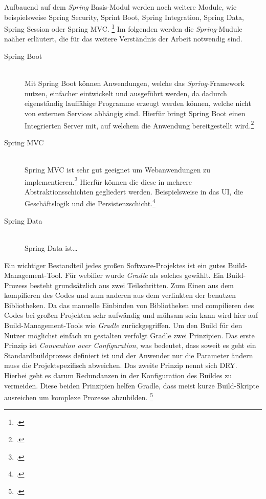 Aufbauend auf dem \textit{Spring} Basis-Modul werden noch weitere Module, wie beispielsweise Spring Security, Sprint Boot, Spring Integration, Spring Data, Spring Session oder Spring MVC. \footcite[Vgl.][2]{springPivotal} Im folgenden werden die \textit{Spring}-Mudule naäher erläutert, die für das weitere Verständnis der Arbeit notwendig sind.

\begin{description}
  \item[Spring Boot] \hfill \\
    Mit Spring Boot können Anwendungen, welche das \textit{Spring}-Framework nutzen, einfacher eintwickelt und ausgeführt werden, da dadurch eigenständig lauffähige Programme erzeugt werden können, welche nicht von externen Services abhängig sind. Hierfür bringt Spring Boot einen Integrierten Server mit, auf welchem die Anwendung bereitgestellt wird.\footcite[Vgl.][1]{springBoot}
  \item[Spring MVC] \hfill \\
    Spring MVC ist sehr gut geeignet um Webanwendungen zu implementieren.\footcite[Vgl.][3]{spring3} Hierfür können die diese in mehrere Abstraktionsschichten gegliedert werden. Beispielsweise in das \ac{UI}, die Geschäftslogik und die Persistenzschicht.\footcite[Vgl.][21]{springMvc}
  \item[Spring Data] \hfill \\
    Spring Data ist\ldots
\end{description}


Ein wichtiger Bestandteil jedes großen Software-Projektes ist ein gutes Build-Management-Tool. Für webifier wurde \textit{Gradle} als solches gewählt. Ein Build-Prozess besteht grundsätzlich aus zwei Teilschritten. Zum Einen aus dem kompilieren des Codes und zum anderen aus dem verlinkten der benutzen Bibliotheken. \cite{buildprozess}
Da das manuelle Einbinden von Bibliotheken und compilieren des Codes bei großen Projekten sehr aufwändig und mühsam sein kann wird hier auf Build-Management-Tools wie \textit{Gradle} zurückgegriffen. Um den Build für den Nutzer möglichst einfach zu gestalten verfolgt Gradle zwei Prinzipien. Das erste Prinzip ist \textit{Convention over Configuration}, was bedeutet, dass soweit es geht ein Standardbuildprozess definiert ist und der Anwender nur die Parameter ändern muss die Projektspezifisch abweichen. Das zweite Prinzip nennt sich \acl{DRY}. Hierbei geht es darum Redundanzen in der Konfiguration des Buildes zu vermeiden. Diese beiden Prinzipien helfen Gradle, dass meist kurze Build-Skripte ausreichen um komplexe Prozesse abzubilden. \footcite[Vgl.][6f]{gradle}

